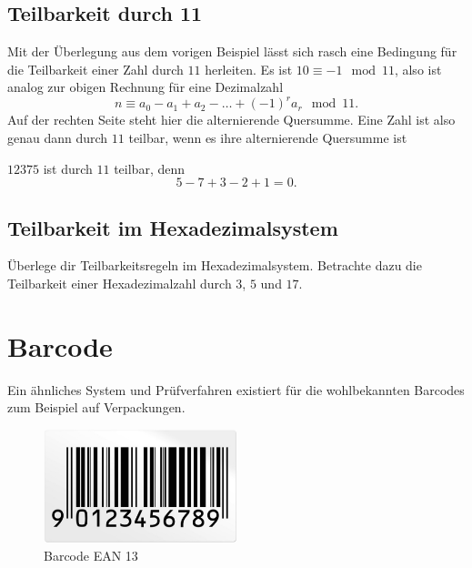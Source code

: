 \documentclass[%
11pt,%
twoside,%
titlepage,%
german,%
headsepline%
]{scrartcl}
\begin{document}
\subsection{Teilbarkeit durch 11}

Mit der Überlegung aus dem vorigen Beispiel lässt sich rasch eine Bedingung für die Teilbarkeit einer Zahl durch $11$ herleiten. Es ist $10\equiv-1\mod11$, also ist analog zur obigen Rechnung für eine Dezimalzahl
$$n\equiv a_0-a_1+a_2-\dots+(-1)^ra_r\mod11.$$
Auf der rechten Seite steht hier die alternierende Quersumme. Eine Zahl ist also genau dann durch $11$ teilbar, wenn es ihre alternierende Quersumme ist

\begin{bsp}
$12375$ ist durch $11$ teilbar, denn
$$5-7+3-2+1=0.$$
\end{bsp}

\subsection{Teilbarkeit im Hexadezimalsystem}

\begin{ueb}
Überlege dir Teilbarkeitsregeln im Hexadezimalsystem. Betrachte dazu die Teilbarkeit einer Hexadezimalzahl durch $3$, $5$ und $17$.
\end{ueb}

\section{Barcode}

Ein ähnliches System und Prüfverfahren existiert für die wohlbekannten Barcodes zum Beispiel auf Verpackungen.

\begin{figure}
\begin{center}
\includegraphics[width=0.5\textwidth]{pictures/barcode}
\end{center}
\caption{Barcode EAN 13}
\end{figure}
\end{document}
